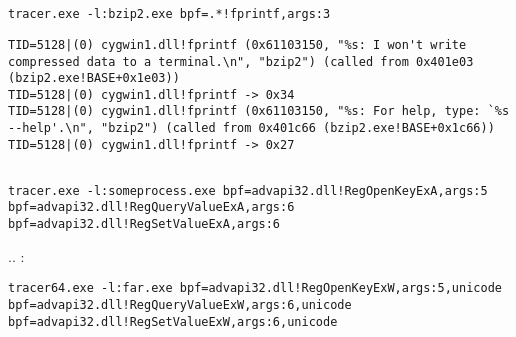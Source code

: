 \section{}

\subsection{}

\begin{lstlisting}
tracer.exe -l:bzip2.exe bpf=.*!fprintf,args:3
\end{lstlisting}

\begin{lstlisting}
TID=5128|(0) cygwin1.dll!fprintf (0x61103150, "%s: I won't write compressed data to a terminal.\n", "bzip2") (called from 0x401e03 (bzip2.exe!BASE+0x1e03))
TID=5128|(0) cygwin1.dll!fprintf -> 0x34
TID=5128|(0) cygwin1.dll!fprintf (0x61103150, "%s: For help, type: `%s --help'.\n", "bzip2") (called from 0x401c66 (bzip2.exe!BASE+0x1c66))
TID=5128|(0) cygwin1.dll!fprintf -> 0x27
\end{lstlisting}

\subsection{}

\begin{lstlisting}
tracer.exe -l:someprocess.exe bpf=advapi32.dll!RegOpenKeyExA,args:5 bpf=advapi32.dll!RegQueryValueExA,args:6 bpf=advapi32.dll!RegSetValueExA,args:6
\end{lstlisting}

.. :

\begin{lstlisting}
tracer64.exe -l:far.exe bpf=advapi32.dll!RegOpenKeyExW,args:5,unicode bpf=advapi32.dll!RegQueryValueExW,args:6,unicode bpf=advapi32.dll!RegSetValueExW,args:6,unicode
\end{lstlisting}

\subsection{}

